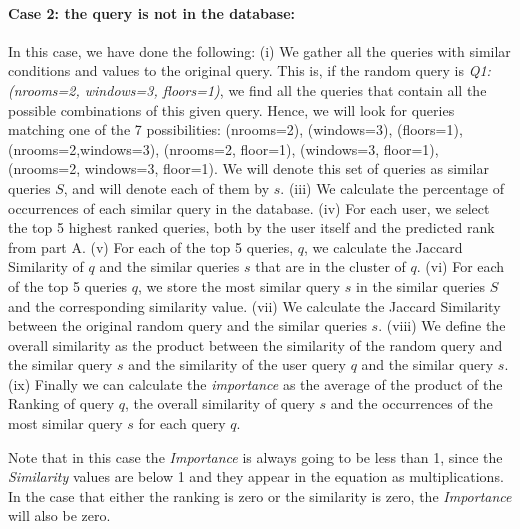 \documentclass[sigconf]{acmart}
\begin{document}
\paragraph{Case 2: the query is not in the database:} In this case, we have done the following: (i) We gather all the queries with similar conditions and values to the original query. This is, if the random query is  \textit{Q1: (nrooms=2, windows=3, floors=1)}, we find all the queries that contain all the possible combinations of this given query. Hence, we will look for queries matching one of the 7 possibilities: (nrooms=2), (windows=3), (floors=1), (nrooms=2,windows=3), (nrooms=2, floor=1), (windows=3, floor=1), (nrooms=2, windows=3, floor=1). We will denote this set of queries as similar queries $S$, and will denote each of them by $s$. (iii) We calculate the percentage of occurrences of each similar query in the database. (iv) For each user, we select the top 5 highest ranked queries, both by the user itself and the predicted rank from part A. (v) For each of the top 5 queries, $q$, we calculate the Jaccard Similarity of $q$ and the similar queries $s$ that are in the cluster of $q$. (vi) For each of the top 5 queries $q$, we store the most similar query $s$ in the similar queries $S$ and the corresponding similarity value. (vii) We calculate the Jaccard Similarity between the original random query and the similar queries $s$. (viii) We define the overall similarity as the product between the similarity of the random query and the similar query $s$  and the similarity of the user query $q$ and the similar query $s$. (ix) Finally we can calculate the \textit{importance} as the average of the product of the Ranking of query $q$, the overall similarity of query $s$ and the occurrences of the most similar query $s$ for each query $q$.  

Note that in this case the \textit{Importance} is always going to be less than 1, since the \textit{Similarity} values are below 1 and they appear in the equation as multiplications. In the case that either the ranking is zero or the similarity is zero, the \textit{Importance} will also be zero.
\end{document}
